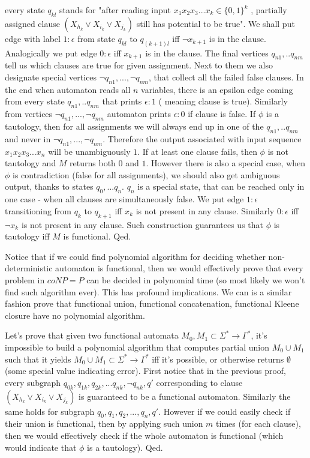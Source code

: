 \documentclass[12pt]{article}
\begin{document}
every state $q_{kl}$ stands for "after reading input $x_1x_2x_3...x_k \in \{0,1\}^k$ , partially assigned clause $(X_{h_k}\vee X_{i_k}\vee X_{j_k})$ still has potential to be true". We shall put edge  with label $1:\epsilon$ from state $q_{kl}$ to $q_{(k+1)l}$ iff $\neg x_{k+1}$ is  in the clause. Analogically we put edge $0:\epsilon$ iff $ x_{k+1}$ is  in the clause. The final vertices $q_{n1},..q_{nm}$ tell us which clauses are true for given assignment. Next to them we also designate special vertices $\neg q_{n1},..., \neg q_{nm}$, that collect all the failed false clauses. In the end when automaton reads all $n$ variables, there is an epsilon edge coming from every state $q_{n1},..q_{nm}$ that prints $\epsilon:1$ ( meaning clause is true). Similarly from vertices $\neg q_{n1},..., \neg q_{nm}$ automaton prints $\epsilon:0$ if clause is false. If $\phi$ is a tautology, then for all assignments we will always end up in one of the $q_{n1},..q_{nm}$ and never in $\neg q_{n1},..., \neg q_{nm}$. Therefore the output associated with input sequence $x_1x_2x_3...x_n$ will be unambiguously $1$. If at least one clause fails, then $\phi$ is not tautology and $M$ returns both $0$ and $1$. However there is also a special case, when $\phi$ is contradiction (false for all assignments), we should also get ambiguous output, thanks to states $q_0,...q_n$. $q_n$ is a special state, that can be reached only in one case - when all clauses are simultaneously false. We put edge $1:\epsilon$ transitioning from $q_k$ to $q_{k+1}$ iff $ x_k$ is not present in any clause. Similarly $0:\epsilon$  iff $ \neg x_k$ is not present in any clause. Such construction guarantees us that $\phi$ is tautology iff $M$ is functional. Qed.

 
Notice that if we could find polynomial algorithm for deciding whether non-deterministic automaton is functional, then we would effectively prove that every problem in $coNP=P$ can be decided in polynomial time (so most likely we won't find such algorithm ever). This has profound implications. 
We can is a similar fashion prove that functional union, functional concatenation, functional Kleene closure have no polynomial algorithm. 

Let's prove that given two functional automata $M_0,M_1 \subset \Sigma^* \rightarrow \Gamma^*$, it's impossible to build a polynomial algorithm that computes partial union $M_0 \cup M_1$ such that it yields $M_0 \cup M_1 \subset \Sigma^* \rightarrow \Gamma^*$ iff it's possible, or otherwise returns $\emptyset$ (some special value indicating error). First notice that in the previous proof, every subgraph $q_{0k},q_{1k},q_{2k},...q_{nk},\neg q_{nk}, q'$ corresponding to clause $(X_{h_k}\vee X_{i_k}\vee X_{j_k})$ is guaranteed to be a functional automaton. Similarly the same holds for subgraph $q_0,q_1,q_2,...,q_n,q'$. However if we could easily check if their union is functional, then by applying such union $m$ times (for each clause), then we would effectively check if the whole automaton is functional (which would indicate that $\phi$ is a tautology). Qed.
\end{document}

